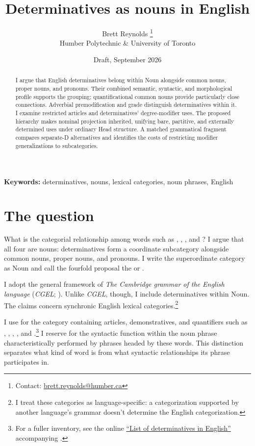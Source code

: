 \documentclass[12pt]{article}
\title{Determinatives as nouns in English}
\author{Brett Reynolds \orcidlink{0000-0003-0073-7195}%
\thanks{Contact: \href{mailto:brett.reynolds@humber.ca}{brett.reynolds@humber.ca}}\\
Humber Polytechnic \& University of Toronto}
\date{Draft, September 2026}
\begin{document}
\maketitle

\begin{abstract}
I argue that English determinatives belong within Noun alongside common nouns, proper nouns, and pronouns. Their combined semantic, syntactic, and morphological profile supports the grouping; quantificational common nouns provide particularly close connections. Adverbial premodification and grade distinguish determinatives within it. I examine restricted articles and determinatives' degree-modifier uses. The proposed hierarchy makes nominal projection inherited, unifying bare, partitive, and externally determined uses under ordinary Head structure. A matched grammatical fragment compares separate-D alternatives and identifies the costs of restricting modifier generalizations to subcategories.
\end{abstract}

\noindent\textbf{Keywords:} determinatives, nouns, lexical categories, noun phrases, English

\section{The question}\label{sec:intro}

What is the categorial relationship among words such as , , , and ? I argue that all four are nouns: determinatives form a coordinate subcategory alongside common nouns, proper nouns, and pronouns. I write the superordinate category as Noun and call the fourfold proposal the  or .

I adopt the general framework of \textit{The Cambridge grammar of the English language} (\textit{CGEL}; \citealt{huddleston2002}). Unlike \textit{CGEL}, though, I include determinatives within Noun. The claims concern synchronic English lexical categories.\footnote{I treat these categories as language-specific: a categorization supported by another language's grammar doesn't determine the English categorization.}

I use  for the category containing articles, demonstratives, and quantifiers such as , , , , and .\footnote{For a fuller inventory, see the online \href{https://www.cambridge.org/highereducation/api/resources/2AC8DF5CA558F8A6FCDFACD0EAF8EA08}{\enquote{List of determinatives in English}} accompanying \textcite{Huddleston2021}.} I reserve  for the syntactic function within the noun phrase characteristically performed by phrases headed by these words. This distinction separates what kind of word  is from what syntactic relationships its phrase participates in.
\end{document}
